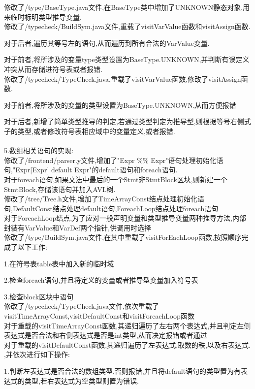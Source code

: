 \documentclass[UTF8]{ctexart}
\begin{document}
修改了/type/BaseType.java文件,在BaseType类中增加了UNKNOWN静态对象,用来临时标明类型推导变量.\\
修改了/typecheck/BuildSym.java文件,重载了visitVarValue函数和visitAssign函数.
\par 对于后者,遍历其等号左的语句,从而遍历到所有合法的VarValue变量.
\par 对于前者,将所涉及的变量type类型设置为BaseType.UNKNOWN,并判断有误定义冲突从而存储进符号表或者报错.\\
修改了/typecheck/TypeCheck.java,重载了visitVarValue函数,修改了visitAssign函数.
\par 对于前者,将所涉及的变量的类型设置为BaseType.UNKNOWN,从而方便报错
\par 对于后者,新增了简单类型推导的判定,若通过类型判定为推导型,则根据等号右侧式子的类型,或者修改符号表相应域中的变量定义,或者报错.\\\\
5.数组相关语句的实现:\\
修改了/frontend/parser.y文件,增加了"Expr \%\% Expr"语句处理初始化语句,"Expr[Expr] default Expr"的default语句和foreach语句.\\
对于foreach语句,如果文法中最后的一个Stmt非StmtBlock区块,则新建一个StmtBlock,存储该语句并加入AVL树.\\
修改了/tree/Tree.h文件,增加了TimeArrayConst结点处理初始化语句,DefaultConst结点处理default语句,ForeachLoop结点处理foreach语句\\
对于ForeachLoop结点,为了应对一般声明变量和类型推导变量两种推导方法,内部封装有VarValue和VarDef两个指针,供调用时选择\\
修改了/type/BuildSym.java文件,在其中重载了visitForEachLoop函数,按照顺序完成了以下工作:
\par 1.在符号表table表中加入新的临时域
\par 2.检查foreach语句,并且将定义的变量或者推导型变量加入符号表
\par 3.检查block区块中语句\\
修改了/typecheck/TypeCheck.java文件,依次重载了visitTimeArrayConst,visitDefaultConst和visitForeachLoop函数\\
对于重载的visitTimeArrayConst函数,其递归遍历了左右两个表达式,并且判定左侧表达式是否合法和右侧表达式是否是int类型,从而决定报错或者通过\\
对于重载的visitDefaultConst函数,其递归遍历了左表达式,取数的秩,以及右表达式.\\,并依次进行如下操作:
\par 1.判断左表达式是否合法的数组类型,否则报错,并且将default语句的类型置为有表达式的类型,若右表达式为空类型则置为错误.
\end{document}
